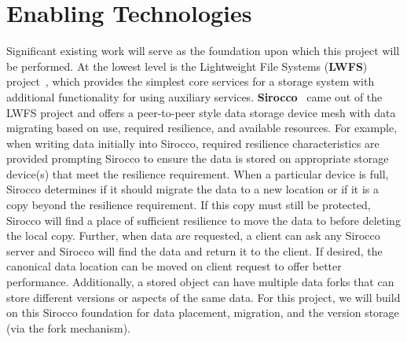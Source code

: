 \section{Enabling Technologies}
\label{sec:enabling-technologies}
Significant existing work will serve as the foundation upon which this project
will be performed.
At the lowest level is the Lightweight File Systems ({\bf LWFS}) project~\cite{oldfield:lwfs},
which provides the simplest core services for a storage system with additional functionality
for using auxiliary services.
%
{\bf Sirocco}~\cite{sirocco} came out of the LWFS project and offers a peer-to-peer style data storage device
mesh with data migrating based on use, required resilience, and available
resources. For example, when writing data initially into Sirocco, required
resilience characteristics are provided prompting Sirocco to ensure the data is
stored on appropriate storage device(s) that meet the resilience requirement.
When a particular device is full, Sirocco determines if it should migrate the
data to a new location or if it is a copy beyond the resilience requirement. If
this copy must still be protected, Sirocco will find a place of sufficient 
resilience to move the data to before deleting the local copy. Further, when
data are requested, a client can ask any Sirocco server and Sirocco will find
the data and return it to the client. If desired, the canonical data location
can be moved on client request to offer better performance. Additionally,
a stored object can have multiple data forks that can
store different versions or aspects of the same data.  For this project, we
will build on this Sirocco foundation for data placement, migration, and the
version storage (via the fork mechanism). 


